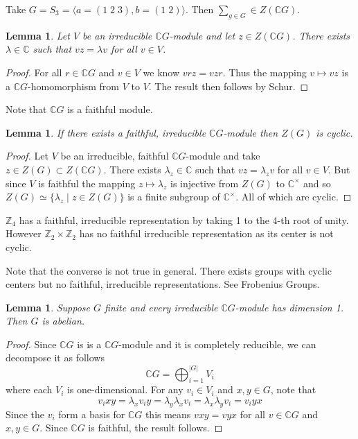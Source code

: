 \documentclass[11pt, notitlepage]{article}
\numberwithin{equation}{section}
\theoremstyle{plain}
\newtheorem{lemma}[theorem]{Lemma}
\theoremstyle{definition}
\newenvironment{remark}
	{\pushQED{\qed}\renewcommand{\qedsymbol}{$\blacklozenge$}\remarkx}
	{\popQED\endremarkx}
\newenvironment{example}
	{\pushQED{\qed}\renewcommand{\qedsymbol}{$\blacktriangleleft$}\examplex}
	{\popQED\endexamplex}
\newcommand{\CG}{{\mathbb{C}G}}
\begin{document}
\begin{example}
	Take $G = S_3 = \langle a=(1\;2\;3), b=(1\;2) \rangle$. Then $\sum_{g\in G} \in Z(\mathbb{C}G)$.
\end{example}

\begin{lemma}
Let $V$ be an irreducible $\mathbb{C}G$-module and let $z \in Z(\mathbb{C}G)$. There exists $\lambda \in \mathbb{C}$ such that $vz = \lambda v$ for all $v\in V$.
\end{lemma}
\begin{proof}
For all $r\in\mathbb{C}G$ and $v\in V$ we know $vrz = vzr$. Thus the mapping $v\mapsto vz$ is a $\mathbb{C}G$-homomorphism from $V$ to $V$. The result then follows by Schur.
\end{proof}

\begin{remark}
Note that $\mathbb{C}G$ is a faithful module.
\end{remark}

\begin{lemma}
If there exists a faithful, irreducible $\mathbb{C}G$-module then $Z(G)$ is cyclic.
\end{lemma}
\begin{proof}
Let $V$ be an irreducible, faithful $\mathbb{C}G$-module and take $z\in Z(G)\subset Z(\mathbb{C}G)$. There exists $\lambda_z\in\mathbb{C}$ such that $vz = \lambda_z v$ for all $v\in V$. But since $V$ is faithful the mapping $z\mapsto \lambda_z$ is injective from $Z(G)$ to $\mathbb{C}^\times$ and so $Z(G) \simeq \{\lambda_z \mid z\in Z(G)\}$ is a finite subgroup of $\mathbb{C}^\times$. All of which are cyclic.
\end{proof}

\begin{example}
$\mathbb{Z}_4$ has a faithful, irreducible representation by taking 1 to the 4-th root of unity. However $\mathbb{Z}_2\times\mathbb{Z}_2$ has no faithful irreducible representation as its center is not cyclic.
\end{example}

\begin{remark}
Note that the converse is not true in general. There exists groups with cyclic centers but no faithful, irreducible representations. See Frobenius Groups.
\end{remark}

\begin{lemma}
Suppose $G$ finite and every irreducible $\mathbb{C}G$-module has dimension 1. Then $G$ is abelian.
\end{lemma}
\begin{proof}
	Since $\CG$ is is a $\CG$-module and it is completely reducible, we can decompose it as follows \[\CG = \bigoplus_{i = 1}^{|G|} V_i\] where each $V_i$ is one-dimensional. For any $v_i\in V_i$ and $x,y\in G$, note that \[v_ixy = \lambda_xv_iy = \lambda_y\lambda_xv_i = \lambda_x\lambda_yv_i = v_iyx\] Since the $v_i$ form a basis for $\CG$ this means $vxy = vyx$ for all $v\in \CG$ and $x,y\in G$. Since $\CG$ is faithful, the result follows.
\end{proof}
\end{document}
